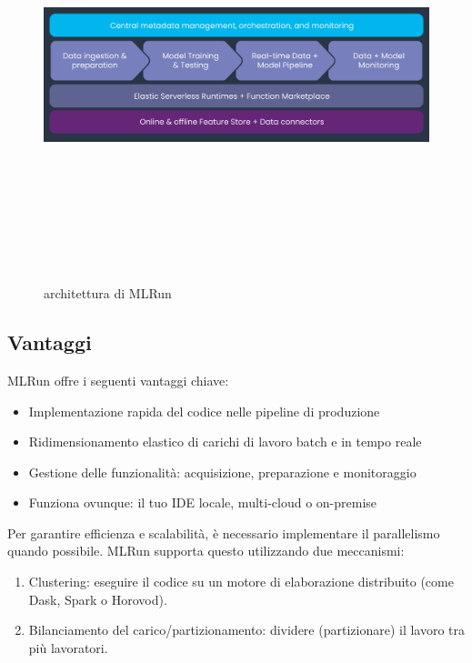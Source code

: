 \documentclass[12pt,a4paper]{report}
\begin{document}
\begin{figure}[h!]
    \begin{center}
        \includegraphics[width=12cm,height=12cm,keepaspectratio]{MLRun}
    \end{center}
    \caption{architettura di MLRun}
    \label{fig:MLRun}
\end{figure}

\subsection{Vantaggi}
MLRun offre i seguenti vantaggi chiave:

\begin{itemize}
    \item Implementazione rapida del codice nelle pipeline di produzione
    \item Ridimensionamento elastico di carichi di lavoro batch e in tempo reale
    \item Gestione delle funzionalità: acquisizione, preparazione e monitoraggio
    \item Funziona ovunque: il tuo IDE locale, multi-cloud o on-premise
\end{itemize}


Per garantire efficienza e scalabilità, è necessario implementare il parallelismo quando possibile. MLRun supporta questo utilizzando due meccanismi:

\begin{enumerate}
    \item Clustering: eseguire il codice su un motore di elaborazione distribuito (come Dask, Spark o Horovod).
    \item Bilanciamento del carico/partizionamento: dividere (partizionare) il lavoro tra più lavoratori.
\end{enumerate}
\end{document}
